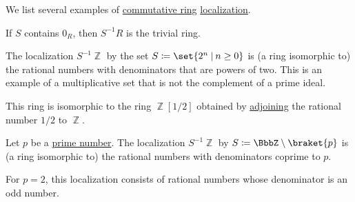 \begin{example}\label{ex:def:ring_localization}
  We list several examples of \hyperref[def:ring/commutative]{commutative ring} \hyperref[def:ring_localization]{localization}.

  \begin{thmenum}
     If \( S \) contains \( 0_R \), then \( S^{-1} R \) is the trivial ring.

     The localization \( S^{-1} \BbbZ \) by the set \( S \coloneqq \set{ 2^n \given n \geq 0 } \) is (a ring isomorphic to) the rational numbers with denominators that are powers of two. This is an example of a multiplicative set that is not the complement of a prime ideal.

    This ring is isomorphic to the ring \( \BbbZ[1 / 2] \) obtained by \hyperref[def:semiring_adjunction]{adjoining} the rational number \( 1 / 2 \) to \( \BbbZ \).

     Let \( p \) be a \hyperref[def:prime_number]{prime number}. The localization \( S^{-1} \BbbZ \) by \( S \coloneqq \BbbZ \setminus \braket{ p } \) is (a ring isomorphic to) the rational numbers with denominators coprime to \( p \).

    For \( p = 2 \), this localization consists of rational numbers whose denominator is an odd number.
  \end{thmenum}
\end{example}

